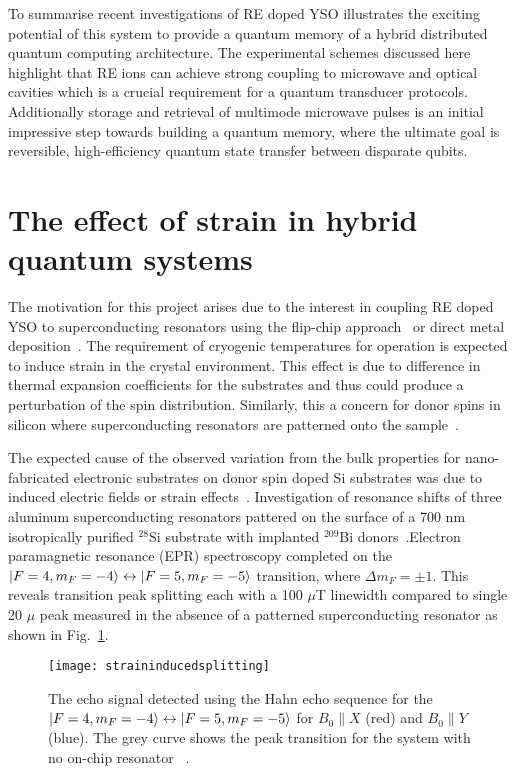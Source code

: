 To summarise recent investigations of RE doped YSO illustrates the exciting potential of this system to provide a quantum memory of a hybrid distributed quantum computing architecture. The experimental schemes discussed here highlight that RE ions can achieve strong coupling to microwave and optical cavities which is a crucial requirement for a quantum transducer protocols. Additionally storage and retrieval of multimode microwave pulses is an initial impressive step towards building a quantum memory, where the ultimate goal is reversible, high-efficiency quantum state transfer between disparate qubits.



\section{The effect of strain in hybrid quantum systems}
The motivation for this project arises due to the interest in coupling RE doped YSO to superconducting resonators using the flip-chip approach~\citep{PhysRevLett.110.157001} or direct metal deposition~\citep{doi:10.1063/1.4894455}. The requirement of cryogenic temperatures for operation is expected to induce strain in the crystal environment. This effect is due to difference in thermal expansion coefficients for the substrates and thus could produce a perturbation of the spin distribution. Similarly, this a concern for donor spins in silicon where superconducting resonators are patterned onto the sample~\citep{doi:10.1063/1.4919761}. 

The expected cause of the observed variation from the bulk properties for nano-fabricated electronic substrates on donor spin doped Si substrates was due to induced electric fields or strain effects~\citep{10.1038/NNANO.2014.211}. Investigation of resonance shifts of three aluminum superconducting resonators pattered on the surface of a 700 nm isotropically purified $^{28}$Si substrate with implanted $^{209}$Bi donors~\citep{PhysRevApplied.9.044014}.Electron paramagnetic resonance (EPR) spectroscopy completed on the $\lvert F=4,m_{F}=-4\rangle \leftrightarrow \lvert F=5,m_{F}=-5\rangle$ transition, where $\Delta m_{F} = \pm 1$. This reveals transition peak splitting each with a 100 $\mu$T linewidth compared to single 20 $\mu$ peak measured in the absence of a patterned superconducting resonator as shown in Fig.~\ref{fig:straininducedsplitting}. 


\begin{figure}[h]
\centering
\texttt{[image: straininducedsplitting]}
\caption{\label{fig:straininducedsplitting} The echo signal detected using the Hahn echo sequence for the $\lvert F=4,m_{F}=-4\rangle \leftrightarrow \lvert F=5,m_{F}=-5\rangle$ for $B_{0} \parallel X$ (red) and $B_{0} \parallel Y$ (blue). The grey curve shows the peak transition for the system with no on-chip resonator ~\citep{PhysRevApplied.9.044014}.}
\end{figure}


